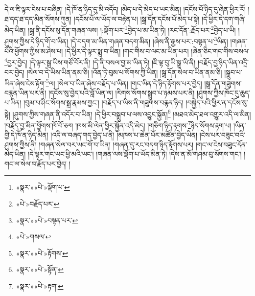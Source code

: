 དེ་ལ་ཇི་ལྟར་ངེས་པ་བཞིན། །དེ་ཁོ་ན་ཉིད་དུ་མི་འདོད། །མེད་པ་དེ་མེད་པ་ཡང་མིན། །དངོས་པོ་ཉིད་དུ་ཞེན་ཕྱིར་རོ། །ཐ་དད་ཐ་དད་མིན་སོགས་ཀུན། །དངོས་པོ་ལ་ཡོད་ལ་བརྟེན་པ། །སྒྲ་དོན་དངོས་པོ་མེད་པ་སྟེ། །དེ་ཕྱིར་དེ་དག་གཞི་མེད་ཡིན། །སྒྲ་ནི་དངོས་སུ་དོན་གཞན་ལས། །:ལྡོག་པར་\footnote{«སྣར་»«པེ་»ལྡོག་པ་}བྱེད་པ་མ་ཡིན་ཏེ། །རང་དོན་:རྗོད་པར་\footnote{«པེ་»བརྗོད་པར་}བྱེད་པ་ཡི། །ཤུགས་ཀྱིས་དེ་ཉིད་གོ་བ་ཡིན། །དེ་བདག་མ་ཡིན་གཞན་བདག་མིན། །ཞེས་ནི་རྒྱས་པར་:བསྟན་པ་\footnote{«སྣར་»«པེ་»བསྟན་པར་}ཡིན། །གཞན་པོའི་ཕྱོགས་ཀྱིས་མ་ཤེས་པ། །དེ་ཕྱིར་དེ་ལྟར་སྨྲ་བ་ཡིན། །གང་གིས་བ་ལང་མ་ཡིན་པར། །ཞེན་ཅིང་གང་གིས་བསལ་\footnote{«པེ་»གསལ་}བྱར་བྱེད། །དེ་ལྟར་སྒྲ་ཡིས་གཙོ་བོར་ནི། །དེ་ནི་བསལ་བྱ་མ་ཡིན་ཏེ། །ཇི་ལྟ་བུ་ཡི་སྒྲ་ཡི་ནི། །བརྗོད་བྱ་ཉིད་ཡིན་འདྲི་བར་བྱེད། །སེལ་བ་དེ་ཡིས་ཡིན་ནམ་ཅི། །འོན་ཏེ་བུམ་པ་སོགས་ཀྱི་ཡིན། །སྒྲ་དོན་སེལ་བ་ཡིན་ནམ་ཅི། །སྒྲུབ་པ་ཡིན་ཞེས་ངེས་རྟོག་\footnote{«སྣར་»«པེ་»རྟོགས་}ལ། །སེལ་བ་ཡིན་ཞེས་བརྗོད་པ་ཡིན། །གང་ཡིན་དེ་ཉིད་རྟོགས་པར་བྱེད། །སྒྲ་དོན་གཟུགས་བརྙན་ཡིན་པར་ནི། །དངོས་སུ་བྱེད་པའི་བློ་ཡིན་ལ། །རིགས་སོགས་སྒྲུབ་པ་ཉམས་པར་ནི། །ཤུགས་ཀྱིས་ཁོང་དུ་ཆུད་པ་ཡིན། །བུམ་པ་ཤིང་སོགས་སྒྲ་རྣམས་ཀྱང་། །བརྗོད་པ་ཡིས་ནི་གཟུགས་བརྙན་ཉིད། །བསྐྱེད་པའི་ཕྱིར་ན་དངོས་སུ་སྟེ། །ཤུགས་ཀྱིས་གཞན་ནི་འདོར་བ་ཡིན། །དེ་ཕྱིར་བསྒྲུབ་པ་ལས་འབྱུང་སྐྱོན།\footnote{«སྣར་»«པེ་»སྟོན།} །མཐའ་མེད་ཐལ་འགྱུར་འདི་ལ་མིན། །བརྗོད་བྱ་མིན་ཕྱོགས་ཁོ་བོ་ཅག །ཁས་མི་ལེན་ཕྱིར་སྐྱོན་འདི་མེད། །གཅིག་ཉིད་རྟགས་\footnote{«སྣར་»«པེ་»རྟག་}ཉིད་སོགས་རྟག་པ། །ཡིན་གྱི་དེ་ཁོ་ན་ཉིད་མིན། །འདི་ལ་བཞད་གད་བྱེད་པ་ནི། །མཁས་པ་ཆེན་པོར་མཚོན་བྱེད་ཡིན། །ངེས་པར་བཟུང་བའི་ཤུགས་ཀྱིས་ནི། །གཞན་སེལ་བར་ཡང་གོ་བ་ཡིན། །གཞན་དུ་རང་བདག་ཉིད་རྟོགས་པར། །གང་ལ་ངེས་བཟུང་དོན་མེད་ཡིན། །དེ་ལྟར་གང་ཡང་ཕྱི་མའི་ཡང་། །གཞན་ལས་ལྡོག་པ་ཡོད་མིན་ཏེ། །དེས་ན་མོ་གཤམ་བུ་སོགས་གང་། །གང་ལ་སེལ་བ་རྗོད་པར་བྱེད། །
